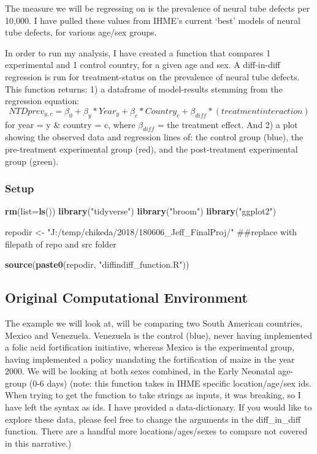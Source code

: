 \documentclass[]{article}
\newenvironment{Shaded}{\begin{snugshade}}{\end{snugshade}}
\newcommand{\KeywordTok}[1]{\textcolor[rgb]{0.13,0.29,0.53}{\textbf{#1}}}
\newcommand{\DataTypeTok}[1]{\textcolor[rgb]{0.13,0.29,0.53}{#1}}
\newcommand{\StringTok}[1]{\textcolor[rgb]{0.31,0.60,0.02}{#1}}
\newcommand{\NormalTok}[1]{#1}
\begin{document}
The measure we will be regressing on is the prevalence of neural tube
defects per 10,000. I have pulled these values from IHME's current
`best' models of neural tube defects, for various age/sex groups.

In order to run my analysis, I have created a function that compares 1
experimental and 1 control country, for a given age and sex. A
diff-in-diff regression is run for treatment-status on the prevalence of
neural tube defects. This function returns: 1) a dataframe of
model-results stemming from the regression equation:
\[NTDprev_{y,c} = \beta_0 + \beta_y*Year_y + \beta_c*Country_c + \beta_{diff}*(treatment interaction)\]
for year = y \& country = c, where \(\beta_{diff}\) = the treatment
effect. And 2) a plot showing the observed data and regression lines of:
the control group (blue), the pre-treatment experimental group (red),
and the post-treatment experimental group (green).

\subsubsection{Setup}\label{setup}

\begin{Shaded}
\begin{Highlighting}[]
\KeywordTok{rm}\NormalTok{(}\DataTypeTok{list=}\KeywordTok{ls}\NormalTok{())}
\KeywordTok{library}\NormalTok{(}\StringTok{"tidyverse"}\NormalTok{)}
\KeywordTok{library}\NormalTok{(}\StringTok{"broom"}\NormalTok{)}
\KeywordTok{library}\NormalTok{(}\StringTok{"ggplot2"}\NormalTok{)}

\NormalTok{repodir <-}\StringTok{ "J:/temp/chikeda/2018/180606_Jeff_FinalProj/"}\NormalTok{ ##replace with filepath of repo and src folder}

\KeywordTok{source}\NormalTok{(}\KeywordTok{paste0}\NormalTok{(repodir, }\StringTok{"diffindiff_function.R"}\NormalTok{))}
\end{Highlighting}
\end{Shaded}

\subsection{Original Computational
Environment}\label{original-computational-environment}

The example we will look at, will be comparing two South American
countries, Mexico and Venezuela. Venezuela is the control (blue), never
having implemented a folic acid fortification initiative, whereas Mexico
is the experimental group, having implemented a policy mandating the
fortification of maize in the year 2000. We will be looking at both
sexes combined, in the Early Neonatal age-group (0-6 days) (note: this
function takes in IHME specific location/age/sex ids. When trying to get
the function to take strings as inputs, it was breaking, so I have left
the syntax as ids. I have provided a data-dictionary. If you would like
to explore these data, please feel free to change the arguments in the
diff\_in\_diff function. There are a handful more locations/ages/sexes
to compare not covered in this narrative.)
\end{document}
